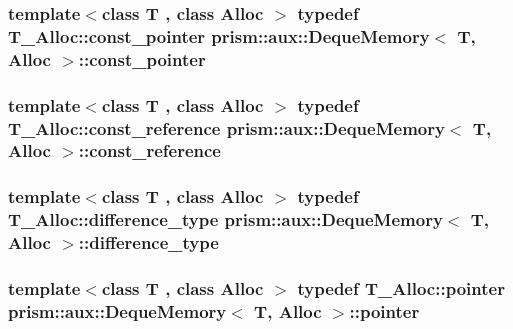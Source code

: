 \subsubsection[{\texorpdfstring{const\+\_\+pointer}{const_pointer}}]{\setlength{\rightskip}{0pt plus 5cm}template$<$class T , class Alloc $>$ typedef T\+\_\+\+Alloc\+::const\+\_\+pointer {\bf prism\+::aux\+::\+Deque\+Memory}$<$ T, Alloc $>$\+::{\bf const\+\_\+pointer}}\hypertarget{structprism_1_1aux_1_1_deque_memory_aad3d6caf7c7594161f7ae44034427f0f}{}\label{structprism_1_1aux_1_1_deque_memory_aad3d6caf7c7594161f7ae44034427f0f}
\subsubsection[{\texorpdfstring{const\+\_\+reference}{const_reference}}]{\setlength{\rightskip}{0pt plus 5cm}template$<$class T , class Alloc $>$ typedef T\+\_\+\+Alloc\+::const\+\_\+reference {\bf prism\+::aux\+::\+Deque\+Memory}$<$ T, Alloc $>$\+::{\bf const\+\_\+reference}}\hypertarget{structprism_1_1aux_1_1_deque_memory_aea80995c139d8feb404c03404667d122}{}\label{structprism_1_1aux_1_1_deque_memory_aea80995c139d8feb404c03404667d122}
\subsubsection[{\texorpdfstring{difference\+\_\+type}{difference_type}}]{\setlength{\rightskip}{0pt plus 5cm}template$<$class T , class Alloc $>$ typedef T\+\_\+\+Alloc\+::difference\+\_\+type {\bf prism\+::aux\+::\+Deque\+Memory}$<$ T, Alloc $>$\+::{\bf difference\+\_\+type}}\hypertarget{structprism_1_1aux_1_1_deque_memory_a9f6b9845bb59ab3edcbb3f846156307e}{}\label{structprism_1_1aux_1_1_deque_memory_a9f6b9845bb59ab3edcbb3f846156307e}
\subsubsection[{\texorpdfstring{pointer}{pointer}}]{\setlength{\rightskip}{0pt plus 5cm}template$<$class T , class Alloc $>$ typedef T\+\_\+\+Alloc\+::pointer {\bf prism\+::aux\+::\+Deque\+Memory}$<$ T, Alloc $>$\+::{\bf pointer}}\hypertarget{structprism_1_1aux_1_1_deque_memory_a049807cdb47e3a25795342851d9c77aa}{}\label{structprism_1_1aux_1_1_deque_memory_a049807cdb47e3a25795342851d9c77aa}
